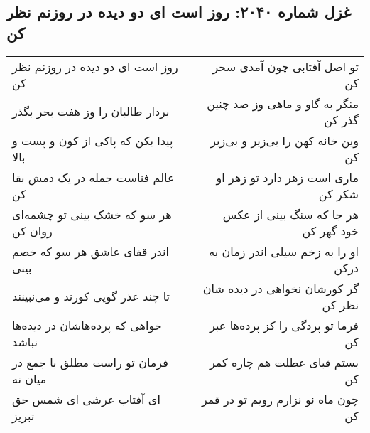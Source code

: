 \begin{center}
\section*{غزل شماره ۲۰۴۰: روز است ای دو دیده در روزنم نظر کن}
\label{sec:2040}
\begin{longtable}{l p{0.5cm} r}
روز است ای دو دیده در روزنم نظر کن
&&
تو اصل آفتابی چون آمدی سحر کن
\\
بردار طالبان را وز هفت بحر بگذر
&&
منگر به گاو و ماهی وز صد چنین گذر کن
\\
پیدا بکن که پاکی از کون و پست و بالا
&&
وین خانه کهن را بی‌زیر و بی‌زبر کن
\\
عالم فناست جمله در یک دمش بقا کن
&&
ماری است زهر دارد تو زهر او شکر کن
\\
هر سو که خشک بینی تو چشمه‌ای روان کن
&&
هر جا که سنگ بینی از عکس خود گهر کن
\\
اندر قفای عاشق هر سو که خصم بینی
&&
او را به زخم سیلی اندر زمان به درکن
\\
تا چند عذر گویی کورند و می‌نبینند
&&
گر کورشان نخواهی در دیده شان نظر کن
\\
خواهی که پرده‌هاشان در دیده‌ها نباشد
&&
فرما تو پردگی را کز پرده‌ها عبر کن
\\
فرمان تو راست مطلق با جمع در میان نه
&&
بستم قبای عطلت هم چاره کمر کن
\\
ای آفتاب عرشی ای شمس حق تبریز
&&
چون ماه نو نزارم رویم تو در قمر کن
\\
\end{longtable}
\end{center}
